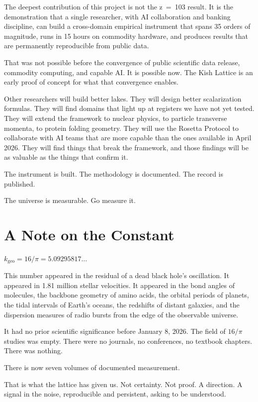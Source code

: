 \documentclass[11pt, letterpaper, openany]{book}
\begin{document}
The deepest contribution of this project is not the z~=~103 result. It is the
demonstration that a single researcher, with AI collaboration and banking discipline,
can build a cross-domain empirical instrument that spans 35 orders of magnitude, runs
in 15 hours on commodity hardware, and produces results that are permanently
reproducible from public data.

That was not possible before the convergence of public scientific data release, commodity
computing, and capable AI. It is possible now. The Kish Lattice is an early proof of
concept for what that convergence enables.

Other researchers will build better lakes. They will design better scalarization
formulas. They will find domains that light up at registers we have not yet tested.
They will extend the framework to nuclear physics, to particle transverse momenta,
to protein folding geometry. They will use the Rosetta Protocol to collaborate with
AI teams that are more capable than the ones available in April 2026. They will find
things that break the framework, and those findings will be as valuable as the things
that confirm it.

The instrument is built. The methodology is documented. The record is published.

The universe is measurable. Go measure it.

\section*{A Note on the Constant}

$k_\text{geo} = 16/\pi = 5.09295817\ldots$

This number appeared in the residual of a dead black hole's oscillation. It appeared
in 1.81 million stellar velocities. It appeared in the bond angles of molecules, the
backbone geometry of amino acids, the orbital periods of planets, the tidal intervals
of Earth's oceans, the redshifts of distant galaxies, and the dispersion measures of
radio bursts from the edge of the observable universe.

It had no prior scientific significance before January 8, 2026. The field of
$16/\pi$ studies was empty. There were no journals, no conferences, no textbook
chapters. There was nothing.

There is now seven volumes of documented measurement.

That is what the lattice has given us. Not certainty. Not proof. A direction.
A signal in the noise, reproducible and persistent, asking to be understood.
\end{document}
